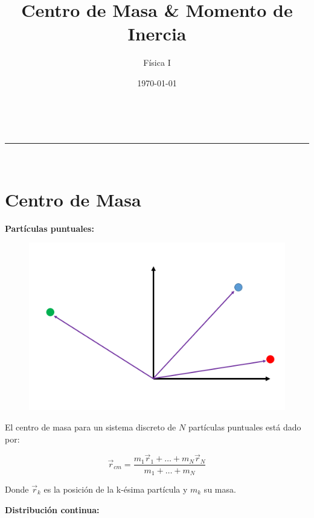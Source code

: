 \documentclass[a4paper,11pt]{article}
\makeatletter
\newcommand{\linia}{\rule{\linewidth}{0.5pt}}
\renewcommand{\maketitle}{
\begin{center}
\vspace{2ex}
{\huge \textsc{\@title}}
\vspace{1ex}
\\
\linia\\
\@author \hfill \@date
\vspace{4ex}
\end{center}
}
\makeatother
\begin{document}
\title{ Centro de Masa \& Momento de Inercia}

\author{Física I}

\date{\today}

\maketitle
\tableofcontents
\setlength\intextsep{-15pt}


\section{Centro de Masa}

\textbf{Partículas puntuales:}


\begin{figure}
	\includegraphics[scale=0.5]{./im/masaspuntuales}
\end{figure}
El centro de masa para un sistema discreto de $N$ partículas puntuales  está dado por:

\begin{equation}
 \vec{r}_{cm}  = \frac{m_1\vec{r}_1 + \dots + m_N \vec{r}_N}{m_1 + \dots + m_N}
\end{equation}

Donde $ \vec{r}_k$ es la posición de la k-ésima partícula y $m_k$ su masa.

\textbf{Distribución continua:}
\end{document}
